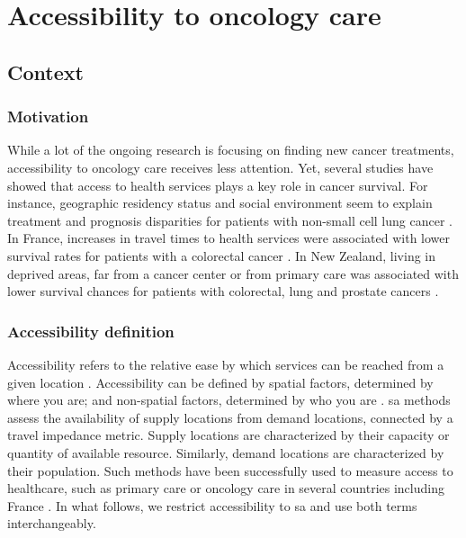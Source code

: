 \chapter{Accessibility to oncology care}

\section{Context}

\subsection{Motivation}

While a lot of the ongoing research is focusing on finding new cancer
treatments, accessibility to oncology care receives less attention. Yet, several
studies have showed that access to health services plays a key role in cancer
survival. For instance, geographic residency status and social environment seem
to explain treatment and prognosis disparities for patients with non-small cell
lung cancer \cite{johnson_treatment_2014}. In France, increases in travel times
to health services were associated with lower survival rates for patients with a
colorectal cancer \cite{dejardin_influence_2014}. In New Zealand, living in
deprived areas, far from a cancer center or from primary care was associated
with lower survival chances for patients with colorectal, lung and prostate
cancers \cite{haynes_cancer_2008}.

\subsection{Accessibility definition}

Accessibility refers to the relative ease by which services can be reached from
a given location \cite{wang_measurement_2012}. Accessibility can be defined by
spatial factors, determined by where you are; and non-spatial factors,
determined by who you are \cite{khan_integrated_1992}. \ac{sa} methods assess
the availability of supply locations from demand locations, connected by a
travel impedance metric. Supply locations are characterized by their capacity or
quantity of available resource. Similarly, demand locations are characterized by
their population. Such methods have been successfully used to measure access to
healthcare, such as primary care \cite{guagliardo_spatial_2004} or oncology care
\cite{wang_measurement_2012,zahnd_spatial_2021,alahmadi_spatial_2013} in several
countries including France
\cite{launay_methodology_2019,gusmano_disparities_2014,gao_assessment_2016}. In
what follows, we restrict accessibility to \acf{sa} and use both terms
interchangeably.

